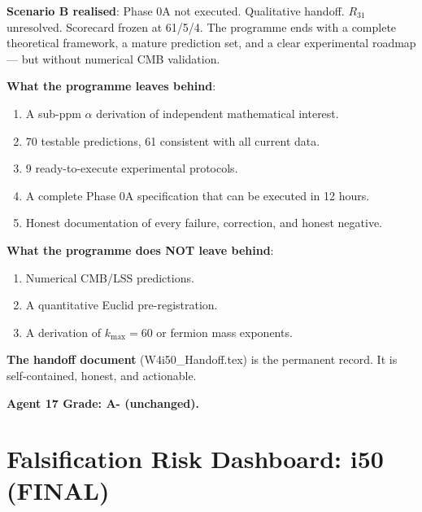 \documentclass[11pt,a4paper]{article}
\begin{document}
\begin{tcolorbox}[colback=blue!5!white, colframe=blue!60!black,
  title={Programme Conclusion: Honest Final Assessment}]

\textbf{Scenario B realised}: Phase 0A not executed. Qualitative handoff. $R_{31}$ unresolved. Scorecard frozen at 61/5/4. The programme ends with a complete theoretical framework, a mature prediction set, and a clear experimental roadmap --- but without numerical CMB validation.

\textbf{What the programme leaves behind}:
\begin{enumerate}
\item A sub-ppm $\alpha$ derivation of independent mathematical interest.
\item 70 testable predictions, 61 consistent with all current data.
\item 9 ready-to-execute experimental protocols.
\item A complete Phase 0A specification that can be executed in 12 hours.
\item Honest documentation of every failure, correction, and honest negative.
\end{enumerate}

\textbf{What the programme does NOT leave behind}:
\begin{enumerate}
\item Numerical CMB/LSS predictions.
\item A quantitative Euclid pre-registration.
\item A derivation of $k_{\max} = 60$ or fermion mass exponents.
\end{enumerate}

\textbf{The handoff document} (W4i50\_Handoff.tex) is the permanent record. It is self-contained, honest, and actionable.
\end{tcolorbox}

\textbf{Agent 17 Grade: A- (unchanged).}


\part{Falsification Risk Dashboard: i50 (FINAL)}
\label{part:risk}
\end{document}
